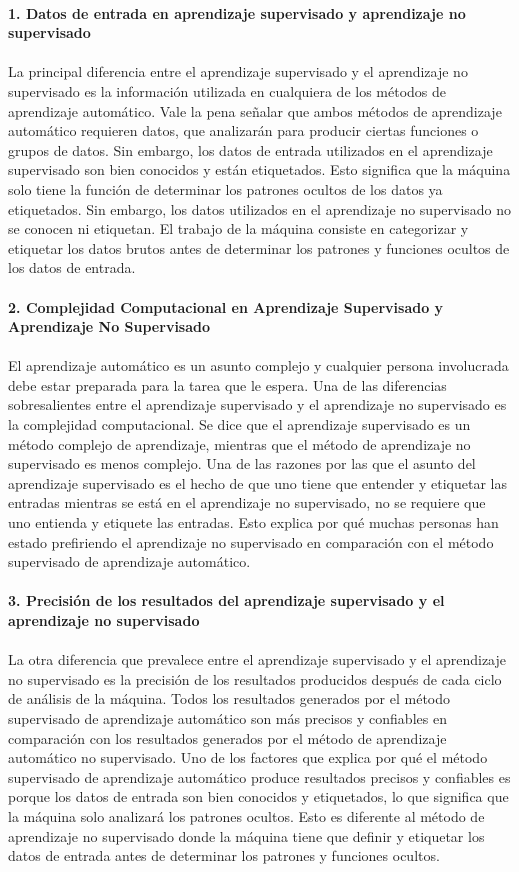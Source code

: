 \documentclass[%
 reprint,
 amsmath,amssymb,
 aps,
]{revtex4-1}
\begin{document}
{\textbf{}\\  
\textbf{1. Datos de entrada en aprendizaje supervisado y aprendizaje no supervisado}\\  
\textbf{}\\  
La principal diferencia entre el aprendizaje supervisado y el aprendizaje no supervisado es la información utilizada en cualquiera de los métodos de aprendizaje automático. Vale la pena señalar que ambos métodos de aprendizaje automático requieren datos, que analizarán para producir ciertas funciones o grupos de datos. Sin embargo, los datos de entrada utilizados en el aprendizaje supervisado son bien conocidos y están etiquetados. Esto significa que la máquina solo tiene la función de determinar los patrones ocultos de los datos ya etiquetados. Sin embargo, los datos utilizados en el aprendizaje no supervisado no se conocen ni etiquetan. El trabajo de la máquina consiste en categorizar y etiquetar los datos brutos antes de determinar los patrones y funciones ocultos de los datos de entrada.
\textbf{}\\  
\textbf{}\\  
\textbf{2. Complejidad Computacional en Aprendizaje Supervisado y Aprendizaje No Supervisado}\\  
\textbf{}\\  
El aprendizaje automático es un asunto complejo y cualquier persona involucrada debe estar preparada para la tarea que le espera. Una de las diferencias sobresalientes entre el aprendizaje supervisado y el aprendizaje no supervisado es la complejidad computacional. Se dice que el aprendizaje supervisado es un método complejo de aprendizaje, mientras que el método de aprendizaje no supervisado es menos complejo. Una de las razones por las que el asunto del aprendizaje supervisado es el hecho de que uno tiene que entender y etiquetar las entradas mientras se está en el aprendizaje no supervisado, no se requiere que uno entienda y etiquete las entradas. Esto explica por qué muchas personas han estado prefiriendo el aprendizaje no supervisado en comparación con el método supervisado de aprendizaje automático.
\textbf{}\\  
\textbf{}\\  
\textbf{3. Precisión de los resultados del aprendizaje supervisado y el aprendizaje no supervisado}\\  
\textbf{}\\  
La otra diferencia que prevalece entre el aprendizaje supervisado y el aprendizaje no supervisado es la precisión de los resultados producidos después de cada ciclo de análisis de la máquina. Todos los resultados generados por el método supervisado de aprendizaje automático son más precisos y confiables en comparación con los resultados generados por el método de aprendizaje automático no supervisado. Uno de los factores que explica por qué el método supervisado de aprendizaje automático produce resultados precisos y confiables es porque los datos de entrada son bien conocidos y etiquetados, lo que significa que la máquina solo analizará los patrones ocultos. Esto es diferente al método de aprendizaje no supervisado donde la máquina tiene que definir y etiquetar los datos de entrada antes de determinar los patrones y funciones ocultos.
}
\end{document}
